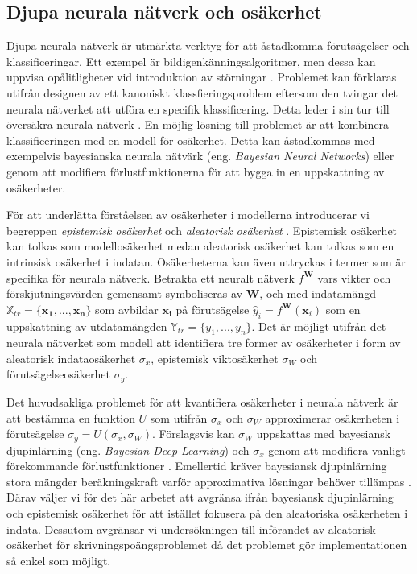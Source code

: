 \subsection{Djupa neurala nätverk och osäkerhet}
\label{NN_and_uncert}
Djupa neurala nätverk är utmärkta verktyg för att åstadkomma förutsägelser och klassificeringar. Ett exempel är bildigenkänningsalgoritmer, men dessa kan uppvisa opålitligheter vid introduktion av störningar \cite{Elephant}. Problemet kan förklaras utifrån designen av ett kanoniskt klassfieringsproblem eftersom den tvingar det neurala nätverket att utföra en specifik klassificering. Detta leder i sin tur till översäkra neurala nätverk \cite{Kendall-Gal}. En möjlig lösning till problemet är att kombinera klassificeringen med en modell för osäkerhet. Detta kan åstadkommas med exempelvis bayesianska neurala nätvärk (eng. \emph{Bayesian Neural Networks}) \cite{Kendall-Gal} eller genom att modifiera förlustfunktionerna för att bygga in en uppskattning av osäkerheter.

För att underlätta förståelsen av osäkerheter i modellerna introducerar vi begreppen \emph{epistemisk osäkerhet} \cite{Uncert} och \emph{aleatorisk osäkerhet} \cite{Uncert}. Epistemisk osäkerhet kan tolkas som modellosäkerhet medan aleatorisk osäkerhet kan tolkas som en intrinsisk osäkerhet i indatan. Osäkerheterna kan även uttryckas i termer som är specifika för neurala nätverk. Betrakta ett neuralt nätverk $f^\mathbf{W}$ vars vikter och förskjutningsvärden gemensamt symboliseras av $\mathbf{W}$, och med indatamängd $\mathbb{X}_{tr} = \{\mathbf{x_1},..., \mathbf{x_n}\}$ som avbildar $\mathbf{x_i}$ på förutsägelse $\hat{y}_i = f^\mathbf{W}(\mathbf{x}_i)$ som en uppskattning av utdatamängden $\mathbb{Y}_{tr} = \{y_1,..., y_n\}$. Det är möjligt utifrån det neurala nätverket som modell att identifiera tre former av osäkerheter i form av aleatorisk indataosäkerhet $\sigma_x$, epistemisk viktosäkerhet $\sigma_W$ och förutsägelseosäkerhet $\sigma_y$.

Det huvudsakliga problemet för att kvantifiera osäkerheter i neurala nätverk är att bestämma en funktion $U$ som utifrån $\sigma_x$ och $\sigma_W$ approximerar osäkerheten i förutsägelse $\sigma_y = U(\sigma_x, \sigma_W)$. Förslagsvis kan $\sigma_W$ uppskattas med bayesiansk djupinlärning (eng. \emph{Bayesian Deep Learning}) \cite{Kendall-Gal} och $\sigma_x$ genom att modifiera vanligt förekommande förlustfunktioner \cite{Kendall-Gal}. Emellertid kräver bayesiansk djupinlärning stora mängder beräkningskraft varför approximativa lösningar behöver tillämpas \cite{MC-dropout}. Därav väljer vi för det här arbetet att avgränsa ifrån bayesiansk djupinlärning och epistemisk osäkerhet för att istället fokusera på den aleatoriska osäkerheten i indata. Dessutom avgränsar vi undersökningen till införandet av aleatorisk osäkerhet för skrivningspoängsproblemet då det problemet gör implementationen så enkel som möjligt.

